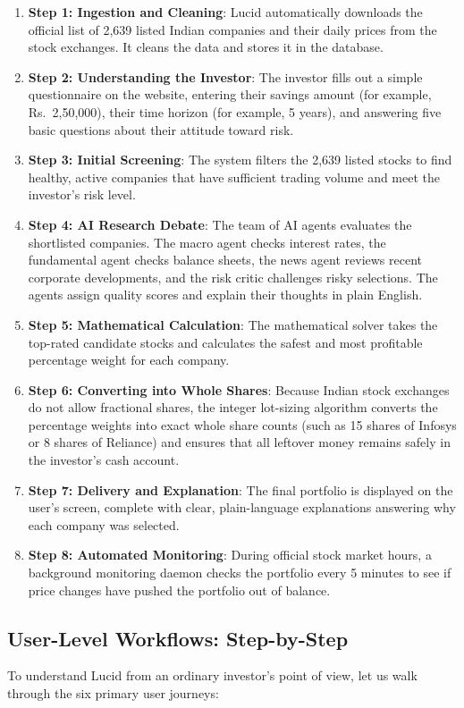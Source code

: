 \begin{enumerate}
    \item \textbf{Step 1: Ingestion and Cleaning}: Lucid automatically downloads the official list of 2,639 listed Indian companies and their daily prices from the stock exchanges. It cleans the data and stores it in the database.
    \item \textbf{Step 2: Understanding the Investor}: The investor fills out a simple questionnaire on the website, entering their savings amount (for example, Rs.~2,50,000), their time horizon (for example, 5 years), and answering five basic questions about their attitude toward risk.
    \item \textbf{Step 3: Initial Screening}: The system filters the 2,639 listed stocks to find healthy, active companies that have sufficient trading volume and meet the investor's risk level.
    \item \textbf{Step 4: AI Research Debate}: The team of AI agents evaluates the shortlisted companies. The macro agent checks interest rates, the fundamental agent checks balance sheets, the news agent reviews recent corporate developments, and the risk critic challenges risky selections. The agents assign quality scores and explain their thoughts in plain English.
    \item \textbf{Step 5: Mathematical Calculation}: The mathematical solver takes the top-rated candidate stocks and calculates the safest and most profitable percentage weight for each company.
    \item \textbf{Step 6: Converting into Whole Shares}: Because Indian stock exchanges do not allow fractional shares, the integer lot-sizing algorithm converts the percentage weights into exact whole share counts (such as 15 shares of Infosys or 8 shares of Reliance) and ensures that all leftover money remains safely in the investor's cash account.
    \item \textbf{Step 7: Delivery and Explanation}: The final portfolio is displayed on the user's screen, complete with clear, plain-language explanations answering why each company was selected.
    \item \textbf{Step 8: Automated Monitoring}: During official stock market hours, a background monitoring daemon checks the portfolio every 5 minutes to see if price changes have pushed the portfolio out of balance.
\end{enumerate}

\subsection{User-Level Workflows: Step-by-Step}
To understand Lucid from an ordinary investor's point of view, let us walk through the six primary user journeys:

